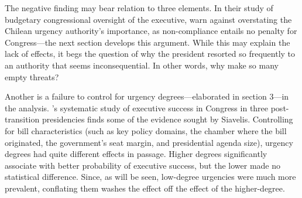 \documentclass[letter,12pt]{article}
\begin{document}
The negative finding may bear relation to three elements. In their study of budgetary congressional oversight of the executive, \citet{berrios.gamboa.fiscChile.2006} warn against overstating the Chilean urgency authority's importance, as non-compliance entails no penalty for Congress---the next section develops this argument. While this may explain the lack of effects, it begs the question of why the president resorted so frequently to an authority that seems inconsequential. In other words, why make so many empty threats?

Another is a failure to control for urgency degrees---elaborated in section 3---in the analysis. \citeauthor{aleman.navia.UrgChi.2009}'s \citeyearpar{aleman.navia.UrgChi.2009} systematic study of executive success in Congress in three post-transition presidencies finds some of the evidence sought by Siavelis. Controlling for bill characteristics (such as key policy domains, the chamber where the bill originated, the government's seat margin, and presidential agenda size), urgency degrees had quite different effects in passage. Higher degrees significantly associate with better probability of executive success, but the lower made no statistical difference. Since, as will be seen, low-degree urgencies were much more prevalent, conflating them washes the effect off the effect of the higher-degree. 

\end{document}
